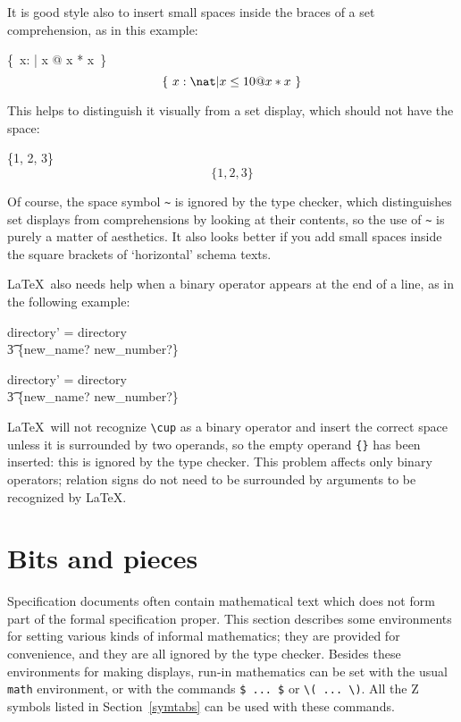 It is good style also to insert small spaces inside the braces of a
set comprehension, as in this example:%
\begin{demo}
\{~x: \nat | x  @ x * x~\}
\gives*
\[\{~x: \nat | x \leq 10 @ x * x~\}\]
\end{demo}
This helps to distinguish it visually from a set display, which should
not have the space:
\begin{demo}
\{1, 2, 3\}
\gives*
\[\{1, 2, 3\}\]
\end{demo}
Of course, the space symbol \verb/~/ is ignored by the type checker,
which distinguishes set displays from comprehensions by looking at
their contents, so the use of \verb/~/ is purely a matter of
aesthetics.  It also looks better if you add small spaces inside the
square brackets of `horizontal' schema texts.

\LaTeX\ also needs help when a binary operator appears at the end of a
line, as in the following example:%
\begin{demo}
\begin{zed}
    directory' = directory \cup {} \\
\t3                 \{new\_name? \mapsto new\_number?\}
\end{zed}
\gives
\begin{zed}
    directory' = directory \cup {} \\
\t3                 \{new\_name? \mapsto new\_number?\}
\end{zed}
\end{demo}
\LaTeX\ will not recognize \verb/\cup/ as a binary operator and insert
the correct space unless it is surrounded by two operands, so the
empty operand \verb/{}/ has been inserted: this is ignored by the
type checker. This problem affects only binary operators; relation
signs do not need to be surrounded by arguments to be recognized by
\LaTeX{}.

\section{Bits and pieces}\label{bitsnbobs}

Specification documents often contain mathematical text which does not
form part of the formal specification proper. This section describes some
environments for setting various kinds of informal mathematics; they are
provided for convenience, and they are all ignored by the
type checker. Besides these environments for making displays, run-in
mathematics can be set with the usual \verb/math/ environment, or with
the commands \verb/$ ... $/ or \hbox{\verb/\( ... \)/}. All the Z
symbols listed in Section~\ref{symtabs} can be used with these
commands.

